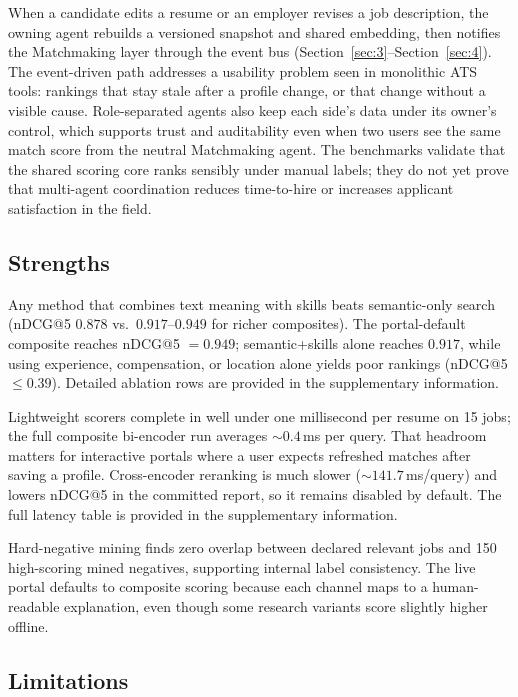 When a candidate edits a resume or an employer revises a job description, the owning agent rebuilds a versioned snapshot and shared embedding, then notifies the Matchmaking layer through the event bus (Section~\ref{sec:3}--Section~\ref{sec:4}).
The event-driven path addresses a usability problem seen in monolithic ATS tools: rankings that stay stale after a profile change, or that change without a visible cause.
Role-separated agents also keep each side's data under its owner's control, which supports trust and auditability even when two users see the same match score from the neutral Matchmaking agent.
The benchmarks validate that the shared scoring core ranks sensibly under manual labels; they do not yet prove that multi-agent coordination reduces time-to-hire or increases applicant satisfaction in the field.

\subsection{Strengths}\label{sec:6-strengths}\label{sec:6-ablation-latency}

Any method that combines text meaning with skills beats semantic-only search (nDCG@5 $0.878$ vs.\ $0.917$--$0.949$ for richer composites).
The portal-default composite reaches nDCG@5 $=0.949$; semantic+skills alone reaches $0.917$, while using experience, compensation, or location alone yields poor rankings (nDCG@5 $\leq 0.39$).
Detailed ablation rows are provided in the supplementary information.

Lightweight scorers complete in well under one millisecond per resume on 15 jobs; the full composite bi-encoder run averages ${\sim}0.4$\,ms per query.
That headroom matters for interactive portals where a user expects refreshed matches after saving a profile.
Cross-encoder reranking is much slower (${\sim}141.7$\,ms/query) and lowers nDCG@5 in the committed report, so it remains disabled by default.
The full latency table is provided in the supplementary information.

Hard-negative mining finds zero overlap between declared relevant jobs and 150 high-scoring mined negatives, supporting internal label consistency.
The live portal defaults to composite scoring because each channel maps to a human-readable explanation, even though some research variants score slightly higher offline.

\subsection{Limitations}\label{sec:6-limitations}\label{sec:6-fairness}\label{sec:6-hard-negs}\label{sec:6-latency}

